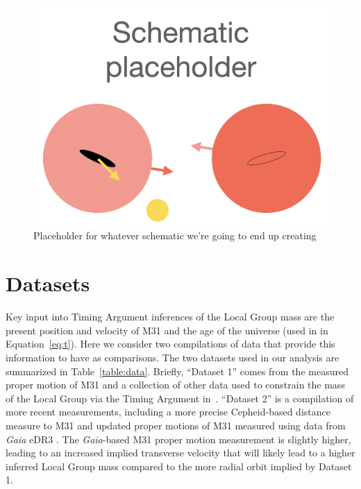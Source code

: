 \documentclass[twocolumn]{aastex631}
\begin{document}

\begin{figure}[htb]
  \centering
  \includegraphics[width=0.8\columnwidth]{schematic_placeholder.png}
  \caption{
    Placeholder for whatever schematic we're going to end up creating
  }
  \label{fig:schematic}
\end{figure}


\section{Datasets}
\label{sec:datasets}

Key input into Timing Argument inferences of the Local Group mass are the
present position and velocity of M31 and the age of the universe (used in in
Equation~\ref{eq:t}).
Here we consider two compilations of data that provide this information to have
as comparisons.
The two datasets used in our analysis are summarized in Table~\ref{table:data}.
Briefly, ``Dataset 1'' comes from the measured proper motion of M31 and a
collection of other data used to constrain the mass of the Local Group via the
Timing Argument in~\citet{vdm2012}.
``Dataset 2'' is a compilation of more recent measurements, including a more
precise Cepheid-based distance measure to M31 \citep{Li2021} and updated proper
motions of M31 measured using data from \textit{Gaia} eDR3 \citep{Salomon2021}.
The \textit{Gaia}-based M31 proper motion measurement is slightly higher,
leading to an increased implied transverse velocity that will likely lead to a
higher inferred Local Group mass compared to the more radial orbit implied by
Dataset 1.
\end{document}
